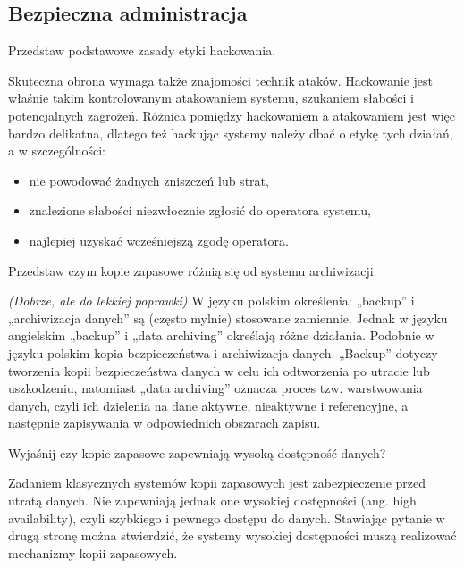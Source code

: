 \documentclass[answers,11pt]{exam}
\newcommand{\fixit}{\textit{(Dobrze, ale do lekkiej poprawki)} }
\begin{document}
\subsection{Bezpieczna administracja}
\begin{questions}

\question Przedstaw podstawowe zasady etyki hackowania.
\begin{solution}
Skuteczna obrona wymaga także znajomości technik ataków. Hackowanie jest właśnie takim kontrolowanym atakowaniem systemu, szukaniem słabości i potencjalnych zagrożeń. Różnica pomiędzy hackowaniem a atakowaniem jest więc bardzo delikatna, dlatego też hackując systemy należy dbać o etykę tych działań, a w szczególności:
\begin{itemize}
\item nie powodować żadnych zniszczeń lub strat,
\item znalezione słabości niezwłocznie zgłosić do operatora systemu,
\item najlepiej uzyskać wcześniejszą zgodę operatora.
\end{itemize}
\end{solution}

\question Przedstaw czym kopie zapasowe różnią się od systemu archiwizacji.
\begin{solution}
\fixit
W języku polskim określenia: „backup” i „archiwizacja danych” są (często mylnie) stosowane zamiennie. Jednak w języku angielskim „backup” i „data archiving” określają różne działania. Podobnie w języku polskim kopia bezpieczeństwa i archiwizacja danych. „Backup” dotyczy tworzenia kopii bezpieczeństwa danych w celu ich odtworzenia po utracie lub uszkodzeniu, natomiast „data archiving” oznacza proces tzw. warstwowania danych, czyli ich dzielenia na dane aktywne, nieaktywne i referencyjne, a następnie zapisywania w odpowiednich obszarach zapisu.
\end{solution}

\question Wyjaśnij czy kopie zapasowe zapewniają wysoką dostępność danych?
\begin{solution}
Zadaniem klasycznych systemów kopii zapasowych jest zabezpieczenie przed utratą danych. Nie zapewniają jednak one wysokiej dostępności (ang. high availability), czyli szybkiego i pewnego dostępu do danych. Stawiając pytanie w drugą stronę można stwierdzić, że systemy wysokiej dostępności muszą realizować mechanizmy kopii zapasowych.
\end{solution}


\end{questions}
\end{document}
